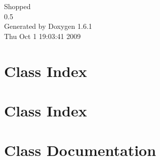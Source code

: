 \documentclass[a4paper]{book}
\begin{document}
\hypersetup{pageanchor=false}
\begin{titlepage}
\vspace*{7cm}
\begin{center}
{\Large Shopped \\[1ex]\large 0.5 }\\
\vspace*{1cm}
{\large Generated by Doxygen 1.6.1}\\
\vspace*{0.5cm}
{\small Thu Oct 1 19:03:41 2009}\\
\end{center}
\end{titlepage}
\clearemptydoublepage
{}
\tableofcontents
\clearemptydoublepage
{}
\hypersetup{pageanchor=true}
\chapter{Class Index}

\chapter{Class Index}

\chapter{Class Documentation}










\printindex
\end{document}

